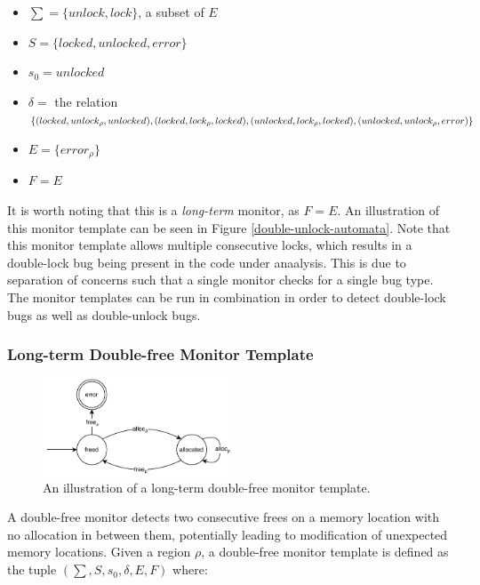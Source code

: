 \begin{itemize}
    \item $\sum = \{unlock, lock\}$, a subset of $E$
    \item $S = \{ locked, unlocked, error \}$
    \item $s_0 = unlocked$ 
    \item $\delta =$ the relation $\{(locked, unlock_\rho, unlocked), (locked, lock_\rho, locked), \\
        (unlocked, lock_\rho, locked), (unlocked, unlock_\rho, error)\}$ 
    \item $E = \{ error_\rho \}$
    \item $F = E$
\end{itemize}

\noindent It is worth noting that this is a \textit{long-term} monitor, as $F = E$. An illustration of this monitor template can be seen in Figure \ref{double-unlock-automata}. Note that this monitor template allows multiple consecutive locks, which results in a double-lock bug being present in the code under anaalysis. This is due to separation of concerns such that a single monitor checks for a single bug type. The monitor templates can be run in combination in order to detect double-lock bugs as well as double-unlock bugs.

\subsubsection*{Long-term Double-free Monitor Template}

\begin{figure}[H]
    \centering
    \includegraphics[width=0.5\textwidth]{algorithm/figures/double-free}
    \caption{An illustration of a long-term double-free monitor template.}
    \label{double-free-automata}
\end{figure}

A double-free monitor detects two consecutive frees on a memory location with no allocation in between them, potentially leading to modification of unexpected memory locations. Given a region $\rho$, a double-free monitor template is defined as the tuple $(\sum, S, s_0, \delta, E, F)$ where: 

